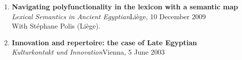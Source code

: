 \documentclass[letterpaper,11pt]{article}
\begin{document}
\begin{enumerate}[resume]
\item \textbf{Navigating polyfunctionality in the lexicon with a semantic map}\\
\textit{Lexical Semantics in Ancient Egyptian}\hfill{Li\`{e}ge, 10 December 2009}\\With St\'{e}phane Polis (Li\`{e}ge).


\item \textbf{Innovation and repertoire: the case of Late Egyptian}\\ \textit{Kulturkontakt und Innovation}\hfill{Vienna, 5 June 2003}

\end{enumerate}
\end{document}
